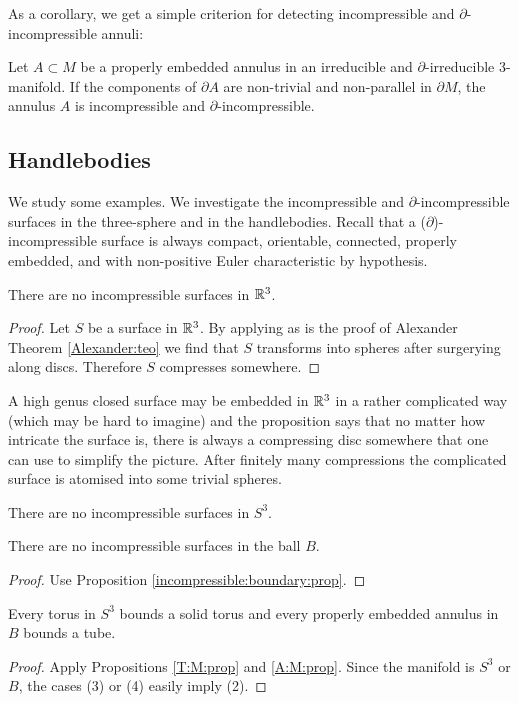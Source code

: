 As a corollary, we get a simple criterion for detecting incompressible and $\partial$-incompressible annuli:

\begin{cor} \label{A:non-parallel:cor}
Let $A\subset M$ be a properly embedded annulus in an irreducible and $\partial$-irreducible 3-manifold. If the components of $\partial A$ are non-trivial and non-parallel in $\partial M$, the annulus $A$ is incompressible and $\partial$-incompressible.
\end{cor}

\subsection{Handlebodies}
We study some examples. We investigate the incompressible and $\partial$-incompressible surfaces in the three-sphere and in the handlebodies. Recall that a ($\partial$)-incompressible surface is always compact, orientable, connected, properly embedded, and with non-positive Euler characteristic by hypothesis.

\begin{prop}
There are no incompressible surfaces in $\mathbb{R}^3$.
\end{prop}
\begin{proof}
Let $S$ be a surface in $\mathbb{R}^3$. By applying as is the proof of Alexander Theorem \ref{Alexander:teo} we find that $S$ transforms into spheres after surgerying along discs. Therefore $S$ compresses somewhere.
\end{proof}

A high genus closed surface may be embedded in $\mathbb{R}^3$ in a rather complicated way (which may be hard to imagine) and the proposition says that no matter how intricate the surface is, there is always a compressing disc somewhere that one can use to simplify the picture. After finitely many compressions the complicated surface is atomised into some trivial spheres. 

\begin{cor} \label{no:inc:B:cor}
There are no incompressible surfaces in $S^3$.
\end{cor}
\begin{cor} \label{B:cor}
There are no incompressible surfaces in the ball $B$.
\end{cor}
\begin{proof}
Use Proposition \ref{incompressible:boundary:prop}.
\end{proof}

\begin{cor}
Every torus in $S^3$ bounds a solid torus and every properly embedded annulus in $B$ bounds a tube.
\end{cor}
\begin{proof}
Apply Propositions \ref{T:M:prop} and \ref{A:M:prop}. Since the manifold is $S^3$ or $B$, the cases (3) or (4) easily imply (2).
\end{proof}


